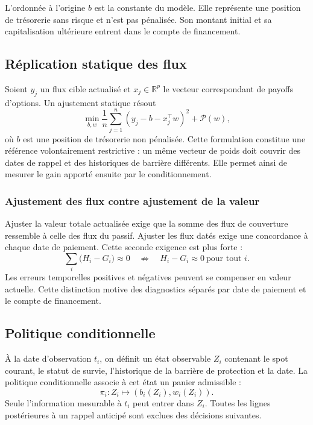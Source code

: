 \documentclass[12pt,a4paper]{article}
\newcommand{\R}{\mathbb{R}}
\newcommand{\1}{\mathbf{1}}
\begin{document}
L'ordonnée à l'origine $b$ est la constante du modèle. Elle représente une
position de trésorerie sans risque et n'est pas pénalisée. Son montant initial
et sa capitalisation ultérieure entrent dans le compte de financement.

\subsection{Réplication statique des flux}

Soient $y_j$ un flux cible actualisé et $x_j\in\R^p$ le vecteur correspondant de payoffs d'options. Un ajustement statique résout
\begin{equation}
 \min_{b,w}\frac1n\sum_{j=1}^n(y_j-b-x_j^\top w)^2+\mathcal P(w),
\label{eq:static-objective}
\end{equation}
où $b$ est une position de trésorerie non pénalisée. Cette formulation constitue
une référence volontairement restrictive : un même vecteur de poids doit couvrir
des dates de rappel et des historiques de barrière différents. Elle permet ainsi
de mesurer le gain apporté ensuite par le conditionnement.

\subsubsection*{Ajustement des flux contre ajustement de la valeur}

Ajuster la valeur totale actualisée exige que la somme des flux de couverture
ressemble à celle des flux du passif. Ajuster les flux datés exige une concordance
à chaque date de paiement. Cette seconde exigence est plus forte :
\begin{equation}
 \sum_i \bigl(H_i-G_i\bigr)\approx0
 \quad\not\Rightarrow\quad
 H_i-G_i\approx0\ \text{pour tout }i.
\label{eq:timing-cancellation}
\end{equation}
Les erreurs temporelles positives et négatives peuvent se compenser en valeur
actuelle. Cette distinction motive des diagnostics séparés par date de paiement
et le compte de financement.

\subsection{Politique conditionnelle}

À la date d'observation $t_i$, on définit un état observable $Z_i$ contenant le spot courant, le statut de survie, l'historique de la barrière de protection et la date. La politique conditionnelle associe à cet état un panier admissible :
\begin{equation}
 \pi_i:Z_i\longmapsto (b_i(Z_i),w_i(Z_i)).
\label{eq:conditional-policy}
\end{equation}
Seule l'information mesurable à $t_i$ peut entrer dans $Z_i$. Toutes les lignes postérieures à un rappel anticipé sont exclues des décisions suivantes.
\end{document}
